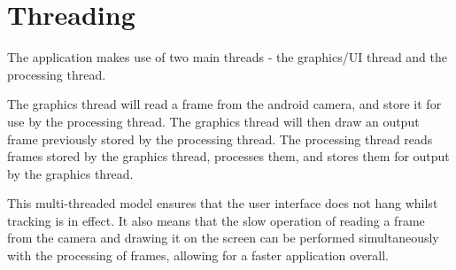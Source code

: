 \section{Threading}

The application makes use of two main threads - the graphics/UI thread and the processing thread.

The graphics thread will read a frame from the android camera, and store it for use by the processing thread. The graphics thread will then draw an output frame previously stored by the processing thread. The processing thread reads frames stored by the graphics thread, processes them, and stores them for output by the graphics thread.

This multi-threaded model ensures that the user interface does not hang whilst tracking is in effect. It also means that the slow operation of reading a frame from the camera and drawing it on the screen can be performed simultaneously with the processing of frames, allowing for a faster application overall.